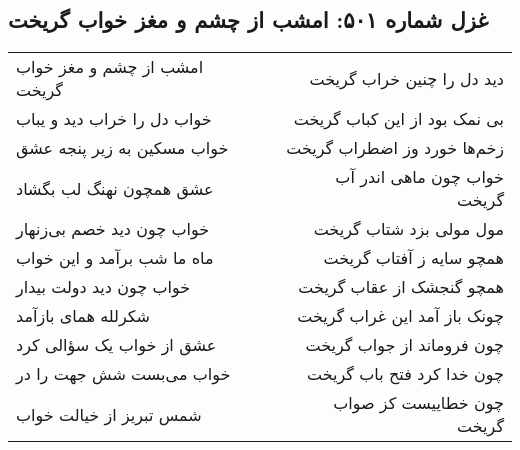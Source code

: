 \begin{center}
\section*{غزل شماره ۵۰۱: امشب از چشم و مغز خواب گریخت}
\label{sec:0501}
\begin{longtable}{l p{0.5cm} r}
امشب از چشم و مغز خواب گریخت
&&
دید دل را چنین خراب گریخت
\\
خواب دل را خراب دید و یباب
&&
بی نمک بود از این کباب گریخت
\\
خواب مسکین به زیر پنجه عشق
&&
زخم‌ها خورد وز اضطراب گریخت
\\
عشق همچون نهنگ لب بگشاد
&&
خواب چون ماهی اندر آب گریخت
\\
خواب چون دید خصم بی‌زنهار
&&
مول مولی بزد شتاب گریخت
\\
ماه ما شب برآمد و این خواب
&&
همچو سایه ز آفتاب گریخت
\\
خواب چون دید دولت بیدار
&&
همچو گنجشک از عقاب گریخت
\\
شکرلله همای بازآمد
&&
چونک باز آمد این غراب گریخت
\\
عشق از خواب یک سؤالی کرد
&&
چون فروماند از جواب گریخت
\\
خواب می‌بست شش جهت را در
&&
چون خدا کرد فتح باب گریخت
\\
شمس تبریز از خیالت خواب
&&
چون خطاییست کز صواب گریخت
\\
\end{longtable}
\end{center}
